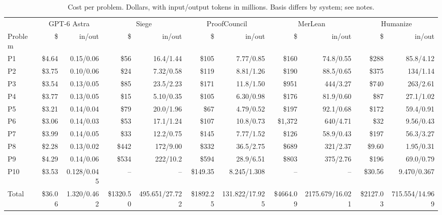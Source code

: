\begin{table}[ht]
\centering\small
\caption{Cost per problem. Dollars, with input/output tokens in millions. Basis differs by system; see notes.}
\label{tab:batch3-costs}
\begin{tabular}{lrrrrrrrrrr}
\toprule
 & \multicolumn{2}{c}{GPT-6 Astra} & \multicolumn{2}{c}{Siege} & \multicolumn{2}{c}{ProofCouncil} & \multicolumn{2}{c}{MerLean} & \multicolumn{2}{c}{Humanize} \\
\cmidrule(lr){2-3}\cmidrule(lr){4-5}\cmidrule(lr){6-7}\cmidrule(lr){8-9}\cmidrule(lr){10-11}
Problem & \$ & in/out & \$ & in/out & \$ & in/out & \$ & in/out & \$ & in/out \\
\midrule
P1 & \$4.64 & 0.15/0.06 & \$56 & 16.4/1.44 & \$105 & 7.77/0.85 & \$160 & 74.8/0.55 & \$288 & 85.8/4.12 \\
P2 & \$3.75 & 0.10/0.06 & \$24 & 7.32/0.58 & \$119 & 8.81/1.26 & \$190 & 88.5/0.65 & \$375 & 134/1.14 \\
P3 & \$3.54 & 0.13/0.05 & \$85 & 23.5/2.23 & \$171 & 11.8/1.50 & \$951 & 444/3.27 & \$740 & 263/2.61 \\
P4 & \$3.77 & 0.13/0.05 & \$15 & 5.10/0.35 & \$105 & 6.30/0.98 & \$176 & 81.9/0.60 & \$87 & 27.1/1.02 \\
P5 & \$3.21 & 0.14/0.04 & \$79 & 20.0/1.96 & \$67 & 4.79/0.52 & \$197 & 92.1/0.68 & \$172 & 59.4/0.91 \\
P6 & \$3.06 & 0.14/0.03 & \$53 & 17.1/1.24 & \$107 & 10.8/0.73 & \$1{,}372 & 640/4.71 & \$32 & 9.56/0.43 \\
P7 & \$3.99 & 0.14/0.05 & \$33 & 12.2/0.75 & \$145 & 7.77/1.52 & \$126 & 58.9/0.43 & \$197 & 56.3/3.27 \\
P8 & \$2.28 & 0.13/0.02 & \$442 & 172/9.00 & \$332 & 36.5/2.75 & \$689 & 321/2.37 & \$9.60 & 1.95/0.31 \\
P9 & \$4.29 & 0.14/0.06 & \$534 & 222/10.2 & \$594 & 28.9/6.51 & \$803 & 375/2.76 & \$196 & 69.0/0.79 \\
P10 & \$3.53 & 0.128/0.045 & -- & -- & \$149.35 & 8.245/1.308 & -- & -- & \$30.56 & 9.470/0.367 \\
\midrule
Total & \$36.06 & 1.320/0.462 & \$1320.50 & 495.651/27.722 & \$1892.25 & 131.822/17.925 & \$4664.09 & 2175.679/16.021 & \$2127.03 & 715.554/14.969 \\
\bottomrule
\end{tabular}
\par\medskip\begin{minipage}{0.95\linewidth}\footnotesize

\end{minipage}
\end{table}
